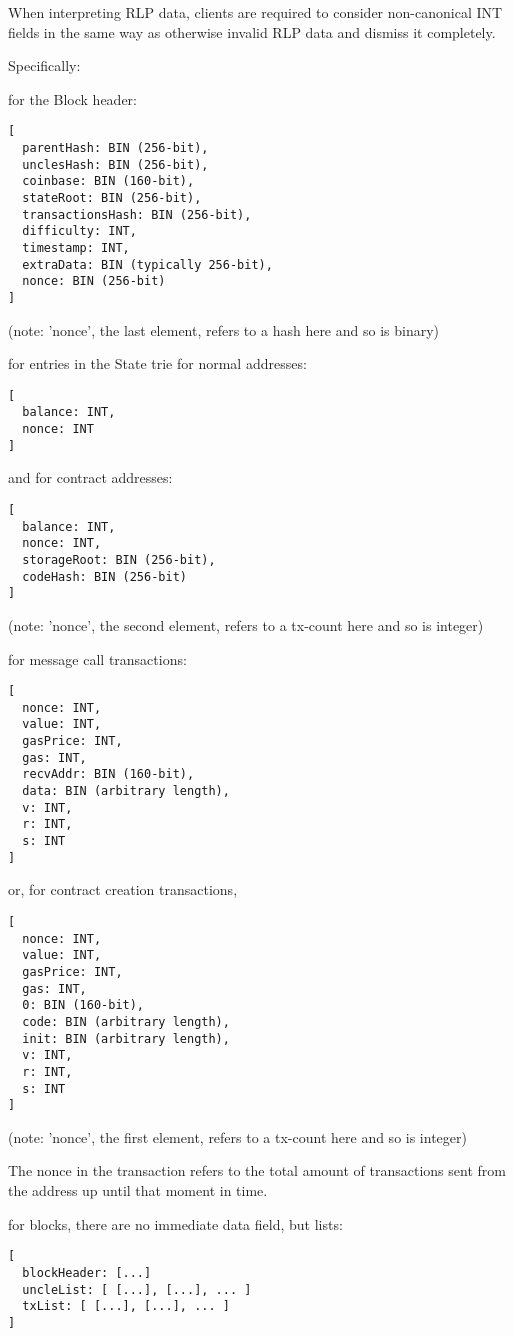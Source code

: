 \documentclass[9pt,oneside]{amsart}
\begin{document}
\begin{multicols}{2}
When interpreting RLP data, clients are required to consider non-canonical INT fields in the same way as otherwise invalid RLP data and dismiss it completely.

Specifically:

for the Block header:
\begin{verbatim}
[
  parentHash: BIN (256-bit),
  unclesHash: BIN (256-bit),
  coinbase: BIN (160-bit),
  stateRoot: BIN (256-bit),
  transactionsHash: BIN (256-bit),
  difficulty: INT,
  timestamp: INT,
  extraData: BIN (typically 256-bit),
  nonce: BIN (256-bit)
]
\end{verbatim}

(note: 'nonce', the last element, refers to a hash here and so is binary)

for entries in the State trie for normal addresses:
\begin{verbatim}
[
  balance: INT,
  nonce: INT
]
\end{verbatim}

and for contract addresses:
\begin{verbatim}
[
  balance: INT,
  nonce: INT,
  storageRoot: BIN (256-bit),
  codeHash: BIN (256-bit)
]
\end{verbatim}

(note: 'nonce', the second element, refers to a tx-count here and so is integer)

for message call transactions:

\begin{verbatim}
[
  nonce: INT,
  value: INT,
  gasPrice: INT,
  gas: INT,
  recvAddr: BIN (160-bit),
  data: BIN (arbitrary length),
  v: INT,
  r: INT,
  s: INT
]
\end{verbatim}

or, for contract creation transactions,

\begin{verbatim}
[
  nonce: INT,
  value: INT,
  gasPrice: INT,
  gas: INT,
  0: BIN (160-bit),
  code: BIN (arbitrary length),
  init: BIN (arbitrary length),
  v: INT,
  r: INT,
  s: INT
]
\end{verbatim}

(note: 'nonce', the first element, refers to a tx-count here and so is integer)

The nonce in the transaction refers to the total amount of transactions sent from the address up until that moment in time.

for blocks, there are no immediate data field, but lists:

\begin{verbatim}
[
  blockHeader: [...]
  uncleList: [ [...], [...], ... ]
  txList: [ [...], [...], ... ]
]
\end{verbatim}


\end{multicols}
\end{document}
